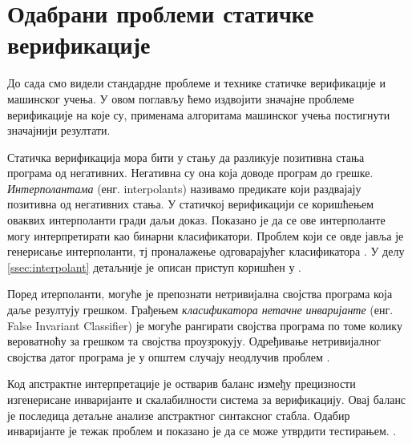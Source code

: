 \documentclass[a4paper]{article}
\begin{document}
{\section{Одабрани проблеми статичке верификације}
До сада смо видели стандардне проблеме и технике статичке верификације и машинског учења. У овом поглављу ћемо издвојити значајне проблеме верификације на које су, применама алгоритама машинског учења постигнути значајнији резултати.


Статичка верификација мора бити у стању да разликује позитивна стања програма од негативних.
Негативна су она која доводе програм до грешке. \textit{Интерполантама} (енг. interpolants)
називамо предикате који раздвајају позитивна од негативних стања.
У статичкој верификацији се коришћењем оваквих интерполанти гради даљи доказ.
Показано је да се ове интерполанте могу интерпретирати као бинарни класификатори.
Проблем који се овде јавља је генерисање интерполанти, тј проналажење одговарајућег класификатора \cite{Sharma_interpolantsas}.
У делу  \ref{ssec:interpolant} детаљније је описан приступ коришћен у \cite{Sharma_interpolantsas}.

Поред итерполанти, могуће је препознати нетривијална својства програма која даље резултују грешком.
Грађењем \textit{класификатора нетачне инваријанте} (енг. False Invariant Classifier) је могуће рангирати
својства програма по томе колику вероватноћу за грешком та својства проузрокују.
Одређивање нетривијалног својства датог програма је у општем случају неодлучив проблем \cite{turing}\cite{Brun04findinglatent}.

Код апстрактне интерпретације је остварив баланс између прецизности изгенерисане инваријанте и скалабилности система за верификацију. Овај баланс је последица детаљне анализе апстрактног синтаксног стабла. Одабир инваријанте је тежак проблем и показано је да се може утврдити тестирањем.\cite{Sharma_interpolantsas} \cite{KrishnaPW15}.

}
\end{document}
